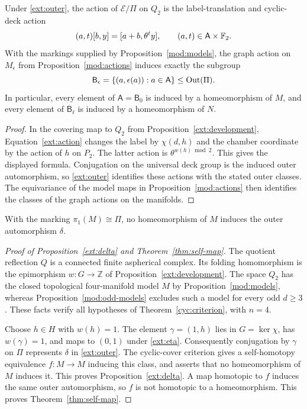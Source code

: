 \begin{proposition}\label{ext:outer-actions}
Under \eqref{ext:outer}, the action of $\mathcal E/\Pi$ on $Q_2$
is the label-translation and cyclic-deck action
\[
 (a,t)[b,y]=[a+b,\theta^t y],
 \qquad (a,t)\in\mathsf A\times\mathbb F_2.
\]
With the markings supplied by Proposition~\ref{mod:models}, the
graph action on $M_\epsilon$ from Proposition~\ref{mod:actions}
induces exactly the subgroup
\[
 \mathsf B_\epsilon
   =\{(a,\epsilon(a)):a\in\mathsf A\}
   \leq\operatorname{Out}(\Pi).
\]
In particular, every element of $\mathsf A=\mathsf B_0$ is
induced by a homeomorphism of $M$, and every element of
$\mathsf B_\ell$ is induced by a homeomorphism of $N$.
\end{proposition}

\begin{proof}
In the covering map to $Q_2$ from
Proposition~\ref{ext:development}, Equation~\eqref{ext:action}
changes the label by $\chi(d,h)$ and the chamber coordinate by
the action of $h$ on $P_2$.  The latter action is
$\theta^{w(h)\bmod 2}$.  This gives the displayed formula.
Conjugation on the universal deck group is the induced outer
automorphism, so \eqref{ext:outer} identifies these actions with
the stated outer classes.  The equivariance of the model maps
in Proposition~\ref{mod:actions} then identifies the classes of
the graph actions on the manifolds.
\end{proof}

\begin{proposition}\label{ext:delta}
With the marking $\pi_1(M)\cong\Pi$, no homeomorphism of $M$
induces the outer automorphism $\delta$.
\end{proposition}

\begin{proof}[Proof of Proposition~\ref{ext:delta} and
Theorem~\ref{thm:self-map}]
The quotient reflection $Q$ is a connected finite aspherical
complex.  Its folding homomorphism is the epimorphism
$w\colon G\to\mathbb Z$ of Proposition~\ref{ext:development}.
The space $Q_2$ has the closed topological four-manifold model
$M$ by Proposition~\ref{mod:models}, whereas
Proposition~\ref{mod:odd-models} excludes such a model for every
odd $d\geq3$.  These facts verify all hypotheses of
Theorem~\ref{cyc:criterion}, with $n=4$.

Choose $h\in H$ with $w(h)=1$.  The element
$\gamma=(1,h)$ lies in $G=\ker\chi$, has $w(\gamma)=1$, and
maps to $(0,1)$ under \eqref{ext:eta}.  Consequently conjugation
by $\gamma$ on $\Pi$ represents $\delta$ in
\eqref{ext:outer}.  The cyclic-cover criterion gives a
self-homotopy equivalence $f\colon M\to M$ inducing this class,
and asserts that no homeomorphism of $M$ induces it.  This proves
Proposition~\ref{ext:delta}.  A map homotopic to $f$ induces the
same outer automorphism, so $f$ is not homotopic to a
homeomorphism.  This proves Theorem~\ref{thm:self-map}.
\end{proof}

